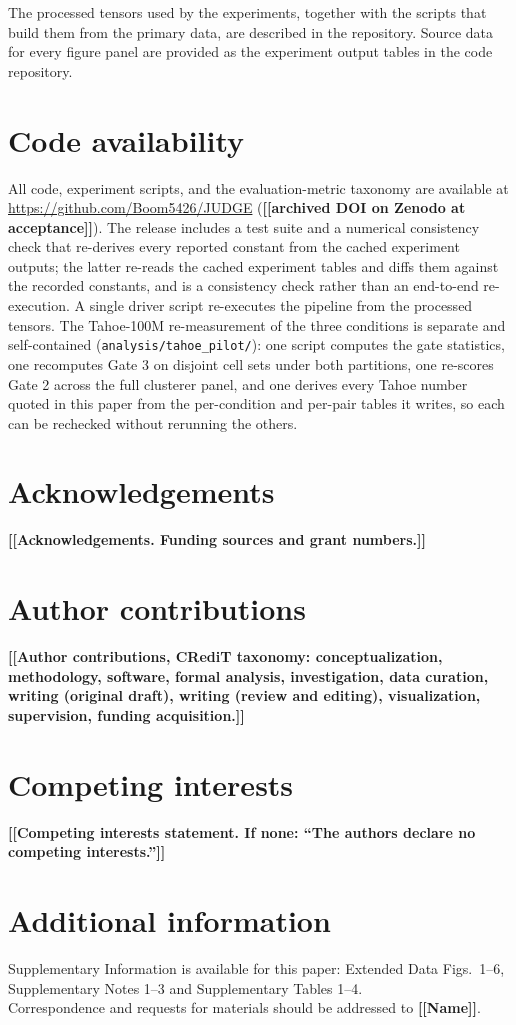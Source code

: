 \documentclass[11pt,letterpaper]{article}
\newcommand{\TODO}[1]{{\color{BrickRed}\textbf{[[#1]]}}}
\begin{document}
The processed tensors used by the experiments, together with the scripts that build them from the
primary data, are described in the repository. Source data for every figure panel are provided as
the experiment output tables in the code repository.

\section*{Code availability}

All code, experiment scripts, and the evaluation-metric taxonomy are available at
\url{https://github.com/Boom5426/JUDGE} (\TODO{archived DOI on Zenodo at acceptance}). The
release includes a test suite and a numerical consistency check that re-derives every
reported constant from the cached experiment outputs; the latter re-reads the cached
experiment tables and diffs them against the recorded constants, and is a consistency check
rather than an end-to-end re-execution. A single driver script re-executes the pipeline from the
processed tensors. The Tahoe-100M re-measurement of the three conditions is separate and
self-contained (\texttt{analysis/tahoe\_pilot/}): one script computes the gate statistics, one
recomputes Gate 3 on disjoint cell sets under both partitions, one re-scores Gate 2 across the
full clusterer panel, and one derives every Tahoe number quoted in this paper from the per-condition
and per-pair tables it writes, so each can be rechecked without rerunning the others.

\section*{Acknowledgements}
\TODO{Acknowledgements. Funding sources and grant numbers.}

\section*{Author contributions}
\TODO{Author contributions, CRediT taxonomy: conceptualization, methodology, software,
formal analysis, investigation, data curation, writing (original draft), writing (review and
editing), visualization, supervision, funding acquisition.}

\section*{Competing interests}
\TODO{Competing interests statement. If none: ``The authors declare no competing interests.''}

\section*{Additional information}
\noindent Supplementary Information is available for this paper: Extended Data Figs.\
1--6, Supplementary Notes 1--3 and Supplementary Tables 1--4.\\
Correspondence and requests for materials should be addressed to \TODO{Name}.



\end{document}
